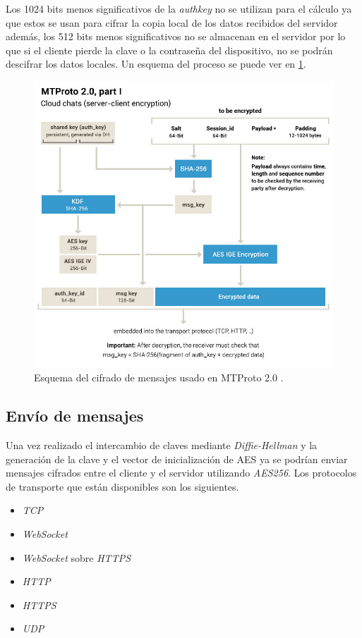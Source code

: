 Los 1024 bits menos significativos de la \emph{auth\textunderscore key} no se utilizan para el cálculo ya que estos se usan para cifrar la copia local de los datos recibidos del servidor además, los 512 bits menos significativos no se almacenan en el servidor por lo que si el cliente pierde la clave o la contraseña del dispositivo, no se podrán descifrar los datos locales. Un esquema del proceso se puede ver en \ref{mtproto2}.
\begin{figure}[htb]
	\centering
	\includegraphics[scale=0.4]{imagenes/diagramaMTProto.jpg} 
	\caption{Esquema del cifrado de mensajes usado en MTProto 2.0 \cite{WebProto}.}
	\label{mtproto2}
\end{figure}

\subsection{Envío de mensajes}
Una vez realizado el intercambio de claves mediante \emph{Diffie-Hellman} y la generación de la clave y el vector de inicialización de AES ya se podrían enviar mensajes cifrados entre el cliente y el servidor utilizando \emph{AES256}.
Los protocolos de transporte que están disponibles son los siguientes.
\begin{itemize}
	\item \emph{TCP}
	\item \emph{WebSocket}
	\item \emph{WebSocket} sobre \emph{HTTPS}
	\item \emph{HTTP}
	\item \emph{HTTPS}
	\item \emph{UDP}
\end{itemize}

